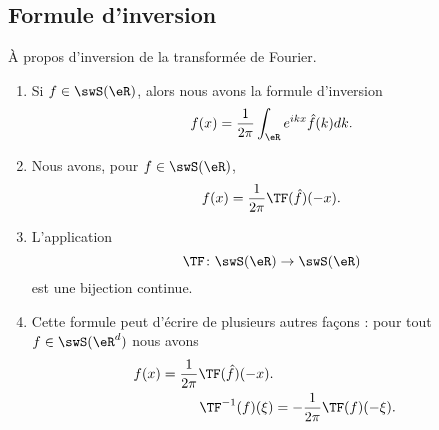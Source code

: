 \subsection{Formule d'inversion}

\begin{proposition}  \label{PROPooLWTJooReGlaN}
	À propos d'inversion de la transformée de Fourier.
	\begin{enumerate}
		\item       \label{ITEMooLVOTooUDJSWt}
		      Si \( f\in\swS(\eR)\), alors nous avons la formule d'inversion
		      \begin{equation}        \label{EQooHIDAooHARdNZ}
			      f(x)=\frac{1}{ 2\pi }\int_{\eR} e^{ikx}\hat f(k)dk.
		      \end{equation}
		\item       \label{ITEMooWINLooJWcDIX}
		      Nous avons, pour \( f\in \swS(\eR)\),
		      \begin{equation}
			      f(x)=\frac{1}{ 2\pi }\TF(\hat f)(-x).
		      \end{equation}
		\item       \label{ITEMooCZYMooRvKTfS}
		      L'application
		      \begin{equation}
			      \TF\colon \swS(\eR)\to \swS(\eR)
		      \end{equation}
		      est une bijection continue.
		\item
		      Cette formule peut d'écrire de plusieurs autres façons : pour tout \( f\in \swS(\eR^d)\) nous avons
		      \begin{subequations}
			      \begin{align}
				      f(x)=\frac{1}{ 2\pi }\TF(\hat f)(-x).     \label{EQooWBZTooPeBNeh} \\
				      \TF^{-1}(f)(\xi) & =-\frac{1}{ 2\pi }\TF(f)(-\xi).
			      \end{align}
		      \end{subequations}
	\end{enumerate}
\end{proposition}

